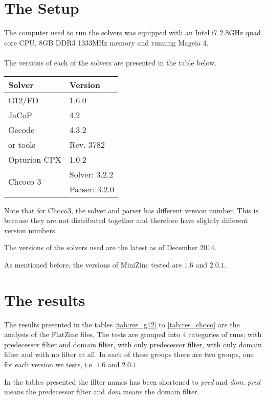 \section{The Setup}
The computer used to run the solvers was equipped with an Intel i7 2.8GHz quad core CPU, 8GB DDR3 1333MHz memory and running Mageia 4.
\\\\
The versions of each of the solvers are presented in the table below.
\begin{table}[h]
\begin{tabular}{l|l}
Solver                    & Version \\ \hline
G12/FD                    & 1.6.0\\
JaCoP                     & 4.2 \\
Gecode                    & 4.3.2 \\
or-tools                  & Rev. 3782 \\
Opturion CPX              & 1.0.2 \\
\multirow{2}{*}{Chcoco 3} & Solver: 3.2.2 \\
                          & Parser: 3.2.0
\end{tabular}
\end{table}
Note that for Choco3, the solver and parser has different version number. This is because they are not distributed together and therefore have slightly different version numbers.

The versions of the solvers used are the latest as of December 2014.

As mentioned before, the versions of MiniZinc tested are $1.6$ and $2.0.1$.

\section{The results}\label{sec:res}
The results presented in the tables \ref{tab:res_g12} to \ref{tab:res_choco} are the analysis of the FlatZinc files. The tests are grouped into 4 categories of runs; with predecessor filter and domain filter, with only predecessor filter, with only domain filter and with no filter at all. In each of these groups there are two groups, one for each version we tests, i.e. $1.6$ and $2.0.1$

In the tables presented the filter names has been shortened to \emph{pred} and \emph{dom}. \emph{pred} means the predecessor filter and \emph{dom} means the domain filter. 




